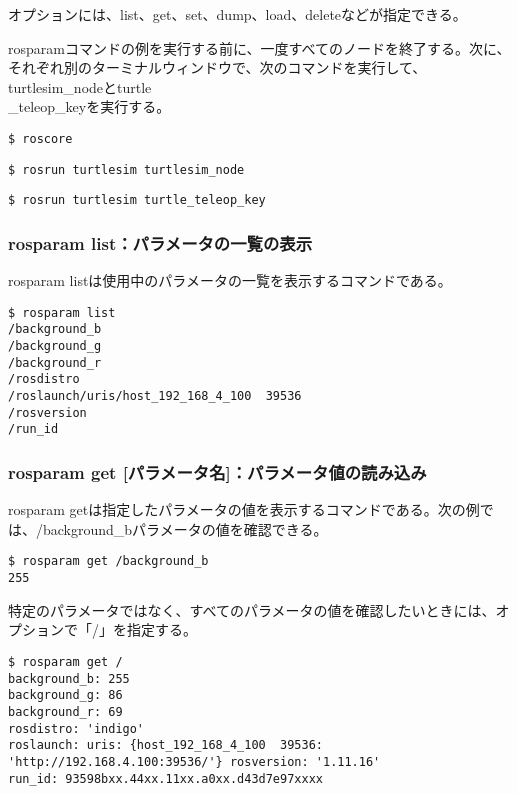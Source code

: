 オプションには、list、get、set、dump、load、deleteなどが指定できる。

rosparamコマンドの例を実行する前に、一度すべてのノードを終了する。次に、それぞれ別のターミナルウィンドウで、次のコマンドを実行して、turtlesim\_nodeとturtle\\\_teleop\_keyを実行する。

\begin{lstlisting}[language=ROS]
$ roscore
\end{lstlisting}

\begin{lstlisting}[language=ROS]
$ rosrun turtlesim turtlesim_node
\end{lstlisting}

\begin{lstlisting}[language=ROS]
$ rosrun turtlesim turtle_teleop_key
\end{lstlisting}

\subsubsection{rosparam list：パラメータの一覧の表示}

rosparam listは使用中のパラメータの一覧を表示するコマンドである。

\begin{lstlisting}[language=ROS]
$ rosparam list
/background_b
/background_g
/background_r
/rosdistro
/roslaunch/uris/host_192_168_4_100  39536
/rosversion
/run_id
\end{lstlisting}

\subsubsection{rosparam get [パラメータ名]：パラメータ値の読み込み}

rosparam getは指定したパラメータの値を表示するコマンドである。次の例では、/background\_bパラメータの値を確認できる。

\begin{lstlisting}[language=ROS]
$ rosparam get /background_b
255
\end{lstlisting}

特定のパラメータではなく、すべてのパラメータの値を確認したいときには、オプションで「/」を指定する。

\begin{lstlisting}[language=ROS]
$ rosparam get /
background_b: 255
background_g: 86
background_r: 69
rosdistro: 'indigo'
roslaunch: uris: {host_192_168_4_100  39536: 'http://192.168.4.100:39536/'} rosversion: '1.11.16'
run_id: 93598bxx.44xx.11xx.a0xx.d43d7e97xxxx
\end{lstlisting}

